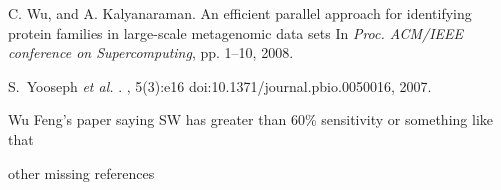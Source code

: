 \documentclass[10pt,journal,letterpaper,compsoc]{IEEEtran}
\begin{document}
\begin{thebibliography}{1}
C. Wu, and A. Kalyanaraman.
\newblock An efficient parallel approach for identifying protein families in large-scale metagenomic data sets
\newblock In {\em Proc. ACM/IEEE conference on Supercomputing}, pp. 1--10, 2008.


S.~Yooseph {\it et al.}
.
, 5(3):e16 doi:10.1371/journal.pbio.0050016,
  2007.



Wu Feng's paper saying SW has greater than 60\% sensitivity or something like that

other missing references





\end{thebibliography}




\end{document}
